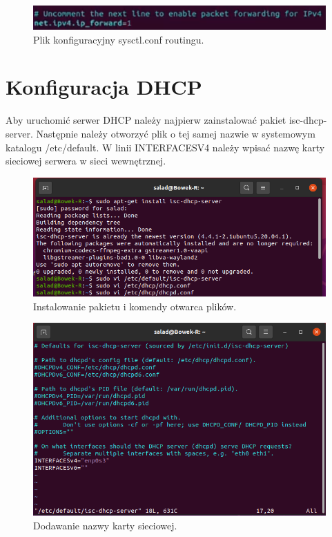 \documentclass{article}
\begin{document}
\begin{figure}[H]
    \centering
    \includegraphics[totalheight=1cm]{2.Routing/wLZORom.png}  
    \caption{Plik konfiguracyjny sysctl.conf routingu.}
    \label{2}
\end{figure}

\section{Konfiguracja DHCP}
Aby uruchomić serwer DHCP należy najpierw zainstalować pakiet isc-dhcp-server.
Następnie należy otworzyć plik o tej samej nazwie w systemowym katalogu /etc/default. W linii INTERFACESV4 należy wpisać nazwę karty sieciowej serwera w sieci wewnętrznej.

\begin{figure}[H]
    \centering
    \includegraphics[scale = 0.75]{dhcp/dhcp2.png}  
    \caption{Instalowanie pakietu i komendy otwarca plików.}
    \label{2}
\end{figure}

\begin{figure}[H]
    \centering
    \includegraphics[scale = 0.75]{dhcp/dhcp3.png}  
    \caption{Dodawanie nazwy karty sieciowej.}
    \label{2}
\end{figure}
\end{document}
